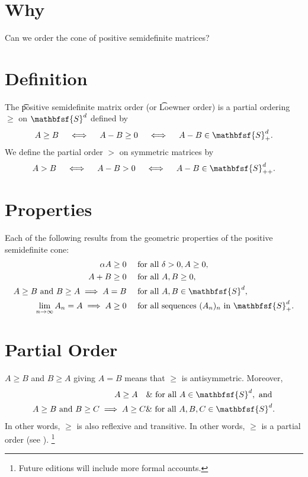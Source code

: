 
\section*{Why}

Can we order the cone of positive semidefinite matrices?

\section*{Definition}

The \t{positive semidefinite matrix order} (or \t{Loewner order}) is a partial ordering $\geq$ on $\mathbfsf{S} ^d$ defined by
  \[
A \geq B \quad \iff \quad A - B \geq 0 \quad \iff \quad A - B \in \mathbfsf{S} _+^d.
  \]
We define the partial order $>$ on symmetric matrices by
    \[
A > B \quad \iff \quad A - B > 0 \quad \iff \quad A - B \in \mathbfsf{S} _{++}^d.
    \]

\section*{Properties}

Each of the following results from the geometric properties of the positive semidefinite cone:
  \[
\begin{aligned}
\alpha  A \geq 0 \quad & \text{ for all } \delta  > 0, A \geq 0, \\
A + B \geq 0 \quad & \text{ for all } A, B \geq 0, \\
A \geq B \text{ and } B \geq A \implies A = B \quad & \text{ for all } A, B \in \mathbfsf{S} ^d, \\
\lim_{n \to \infty} A_n = A \implies A \geq 0 \quad & \text{ for all sequences } (A_n)_n \text{ in } \mathbfsf{S} _+^d.
\end{aligned}
  \]

\section*{Partial Order}

$A \geq B$ and $B \geq A$ giving $A = B$ means that $\geq$ is antisymmetric.
Moreover,
  \[
\begin{aligned}
A \geq A \quad \& \text{ for all } A \in \mathbfsf{S} ^d, \text{ and } \\
A \geq B \text{ and } B \geq C \implies A \geq C \& \text { for all } A, B, C \in \mathbfsf{S} ^d.
\end{aligned}
  \]
In other words, $\geq$ is also reflexive and transitive.
In other words, $\geq$ is a partial order (see ).
    \ifhmode\unskip\fi\footnote{
Future editions will include more formal accounts.
    }

